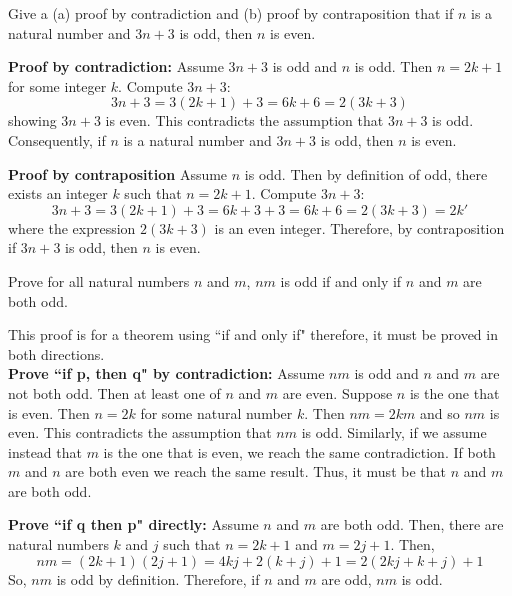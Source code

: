 \begin{questions}
 Give a (a) proof by contradiction and (b) proof by contraposition that if $n$ is a natural
number and $3n+3$ is odd, then $n$ is even.
    \ifprintanswers
        \vspace{-10pt}
    \fi
\begin{solution}
    \textbf{Proof by contradiction:} Assume $3n+3$ is odd and $n$ is
    odd.  Then $n=2k + 1$ for some integer $k$.  Compute
    $3n+3$:
    \[ 3n + 3 = 3(2k+1) + 3 = 6k + 6 = 2(3k + 3)\]
    showing $3n+3$ is even. This contradicts the assumption that $3n
    + 3$ is odd. Consequently, if $n$ is a natural number and $3n + 3$ is odd, then $n$ is even.

    \textbf{Proof by contraposition} Assume $n$ is odd. Then by definition of odd, there exists an integer $k$ such that $n = 2k+1$.  Compute $3n+3$:
    \[ 3n+3 = 3(2k+1) + 3 = 6k + 3 + 3 = 6k + 6 = 2(3k + 3) = 2k' \]
    where the expression $2(3k+3)$ is an even integer.  Therefore, by contraposition if $3n+3$ is odd, then $n$ is even.
\end{solution}


 Prove for all natural numbers $n$ and $m$, $nm$ is odd if
and only if $n$ and $m$ are both odd.
    \ifprintanswers
        \vspace{-10pt}
    \fi
\begin{solution}
     This proof is for a theorem using ``if and only if" therefore,
     it must be proved in both directions.  \\
    \textbf{Prove ``if p, then q" by contradiction:} Assume $nm$ is
    odd and $n$ and $m$ are not both odd.  Then at least one of $n$
    and $m$ are even.  Suppose $n$ is the one that is even. Then
    $n=2k$ for some natural number $k$.  Then $nm = 2km$ and so $nm$
    is even.  This contradicts the assumption that $nm$ is odd.
    Similarly, if we assume instead that $m$ is the one that is even,
    we reach the same contradiction.   If both $m$ and $n$ are both
    even we reach the same result.  Thus, it must be that $n$ and
    $m$ are both odd.

    \smallskip
    \textbf{Prove ``if q then p" directly:} Assume $n$ and $m$ are
    both odd.  Then, there are natural numbers $k$ and $j$ such
    that $n = 2k+1$ and $m=2j+1$.  Then,
    \[ nm = (2k+1)(2j+1) = 4kj + 2(k+j) +1 = 2(2kj +k + j) +1 \]
    So, $nm$ is odd by definition. Therefore, if $n$ and $m$ are
    odd, $nm$ is odd.
\end{solution}



\end{questions}
